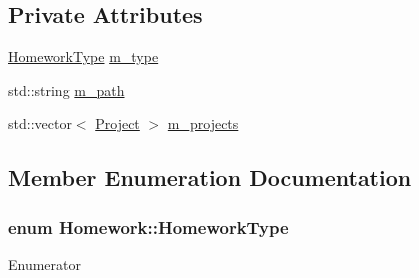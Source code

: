 \subsection*{Private Attributes}
\begin{DoxyCompactItemize}
\item 
\hyperlink{class_homework_a6509dc051b3763d7fea21b4557d3e79e}{Homework\+Type} \hyperlink{class_homework_a2a684368d7bdfaa95ee102e4fa6372ba}{m\+\_\+type}
\item 
std\+::string \hyperlink{class_homework_acfd58f754bd1712de9903dc986dc6d1e}{m\+\_\+path}
\item 
std\+::vector$<$ \hyperlink{class_project}{Project} $>$ \hyperlink{class_homework_a7d9479cfebf02074e2ac340561f7fb8e}{m\+\_\+projects}
\end{DoxyCompactItemize}


\subsection{Member Enumeration Documentation}
\subsubsection[{\texorpdfstring{Homework\+Type}{HomeworkType}}]{\setlength{\rightskip}{0pt plus 5cm}enum {\bf Homework\+::\+Homework\+Type}}\hypertarget{class_homework_a6509dc051b3763d7fea21b4557d3e79e}{}\label{class_homework_a6509dc051b3763d7fea21b4557d3e79e}
\begin{Desc}
\item[Enumerator]\par
\begin{description}
\item[{\em 
Single\hypertarget{class_homework_a6509dc051b3763d7fea21b4557d3e79ea36e19dfd1e533060c7fe573d957186b7}{}\label{class_homework_a6509dc051b3763d7fea21b4557d3e79ea36e19dfd1e533060c7fe573d957186b7}
}]\item[{\em 
Multiple\hypertarget{class_homework_a6509dc051b3763d7fea21b4557d3e79ea70ece26b542060114ccdffac5e147ee9}{}\label{class_homework_a6509dc051b3763d7fea21b4557d3e79ea70ece26b542060114ccdffac5e147ee9}
}]\end{description}
\end{Desc}



